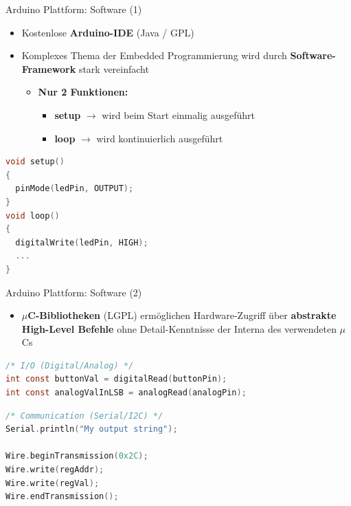 \documentclass{beamer}
\begin{document}
\begin{frame}[fragile]{Arduino Plattform: Software (1)}
\begin{itemize}
	\item Kostenlose \textbf{Arduino-IDE} (Java / GPL)
\end{itemize}
\begin{itemize}
	\item Komplexes Thema der Embedded Programmierung wird durch \textbf{Software-Framework} stark vereinfacht
	\begin{itemize}
	 	\item \textbf{Nur 2 Funktionen:}
	 	\begin{itemize}
	 		\item \textbf{setup} $\rightarrow$ wird beim Start einmalig ausgef\"uhrt
	 		\item \textbf{loop} $\rightarrow$ wird kontinuierlich ausgef\"uhrt
	 	\end{itemize}
	 \end{itemize}
\end{itemize}
\begin{lstlisting}[frame=single, language=C]
void setup()
{
  pinMode(ledPin, OUTPUT);
}
void loop()
{
  digitalWrite(ledPin, HIGH);
  ...
}
\end{lstlisting}
\end{frame}
\begin{frame}[fragile]{Arduino Plattform: Software (2)}
\begin{itemize}
 	\item \textbf{$\mu$C-Bibliotheken} (LGPL) erm\"oglichen Hardware-Zugriff \"uber \textbf{abstrakte High-Level Befehle} ohne Detail-Kenntnisse der Interna des verwendeten $\mu$Cs
\end{itemize}
\begin{lstlisting}[frame=single, language=C]
/* I/O (Digital/Analog) */
int const buttonVal = digitalRead(buttonPin);
int const analogValInLSB = analogRead(analogPin); 
\end{lstlisting}
\begin{lstlisting}[frame=single, language=C]
/* Communication (Serial/I2C) */
Serial.println("My output string");

Wire.beginTransmission(0x2C);
Wire.write(regAddr);
Wire.write(regVal);
Wire.endTransmission();
\end{lstlisting}
\end{frame}
\end{document}
